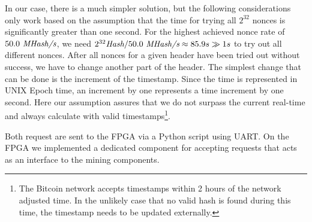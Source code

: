 In our case, there is a much simpler solution, but the following considerations only work based on the assumption that the time for trying all $2^{32}$ nonces is significantly greater than one second. 
For the highest achieved nonce rate of $50.0~\textit{MHash/s}$, we need $ 2^{32} \textit{Hash} / 50.0~\textit{MHash/s} \approx 85.9s \gg 1s$ to try out all different nonces. After all nonces for a given header have been tried out without success, we have to change another part of the header. 
The simplest change that can be done is the increment of the timestamp.
Since the time is represented in UNIX Epoch time, an increment by one represents a time increment by one second. Here our assumption assures that we do not surpass the current real-time and always calculate with valid timestamps\footnote{The Bitcoin network accepts timestamps within 2 hours of the network adjusted time. In the unlikely case that no valid hash is found during this time, the timestamp needs to be updated externally.}.

Both request are sent to the FPGA via a Python script using UART. 
On the FPGA we implemented a dedicated component for accepting requests that acts as an interface to the mining components.

